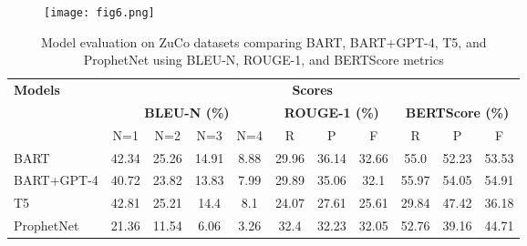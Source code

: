 \documentclass[journal]{IEEEtran}
\begin{document}
\begin{figure*}[!t]
	\renewcommand{\arraystretch}{1.3}
	\centering
	\caption\normalsize{}
	\label{fig:bert_score}
	\texttt{[image: fig6.png]} 
	\vspace{-10pt} %
	
\end{figure*}

\begin{table*}[!t]
	\renewcommand{\arraystretch}{1.3}
	\caption{\large Model evaluation on ZuCo datasets comparing BART, BART+GPT-4, T5, and ProphetNet using BLEU-N, ROUGE-1, and BERTScore metrics}
	\label{tab:Table_of_our_results}
	\centering
	\fontsize{12pt}{12pt}\selectfont
	\begin{tabular}{|l|cccc|ccc|ccc|}
		\hline
		\multirow{2}{*}{\textbf{Models}} & \multicolumn{10}{c|}{\textbf{Scores}} \\
		\cline{2-11}
		& \multicolumn{4}{c|}{\textbf{BLEU-N (\%)}} & \multicolumn{3}{c|}{\textbf{ROUGE-1 (\%)}} & \multicolumn{3}{c|}{\textbf{BERTScore (\%)}} \\
		\cline{2-11}
		           & N=1   & N=2   & N=3   & N=4  & R     & P     & F     & R     & P     & F     \\
		\hline
		BART       & 42.34 & 25.26 & 14.91 & 8.88 & 29.96 & 36.14 & 32.66 & 55.0  & 52.23 & 53.53 \\
		BART+GPT-4 & 40.72 & 23.82 & 13.83 & 7.99 & 29.89 & 35.06 & 32.1  & 55.97 & 54.05 & 54.91 \\
		T5         & 42.81 & 25.21 & 14.4  & 8.1  & 24.07 & 27.61 & 25.61 & 29.84 & 47.42 & 36.18 \\
		ProphetNet & 21.36 & 11.54 & 6.06  & 3.26 & 32.4  & 32.23 & 32.05 & 52.76 & 39.16 & 44.71 \\
		\hline
	\end{tabular}
\end{table*}
\end{document}
